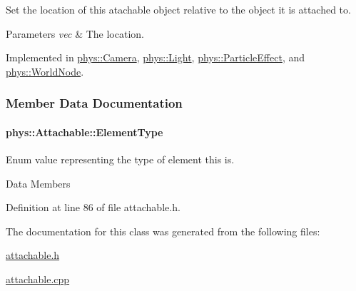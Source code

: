 Set the location of this atachable object relative to the object it is attached to. 


\begin{DoxyParams}{Parameters}
{\em vec} & The location. \\
\hline
\end{DoxyParams}


Implemented in \hyperlink{classphys_1_1Camera_afd2a77e96dd6d0dec1071dcc3229425f}{phys::Camera}, \hyperlink{classphys_1_1Light_adf0d72c9ad1b0cff94bd7f4cba987750}{phys::Light}, \hyperlink{classphys_1_1ParticleEffect_a4371533c2d1d533208b7bc8a067a67e5}{phys::ParticleEffect}, and \hyperlink{classphys_1_1WorldNode_af276da0d87f4ddc1405bc87b9e2e034d}{phys::WorldNode}.



\subsubsection{Member Data Documentation}
\hypertarget{classphys_1_1Attachable_af574d5f08a304c6e0ae002bb2fc057c7}{
\paragraph[{ElementType}]{ {\bf phys::Attachable::ElementType}}\hfill}
\label{classphys_1_1Attachable_af574d5f08a304c6e0ae002bb2fc057c7}


Enum value representing the type of element this is. 

Data Members 

Definition at line 86 of file attachable.h.



The documentation for this class was generated from the following files:\begin{DoxyCompactItemize}
\item 
\hyperlink{attachable_8h}{attachable.h}\item 
\hyperlink{attachable_8cpp}{attachable.cpp}\end{DoxyCompactItemize}
